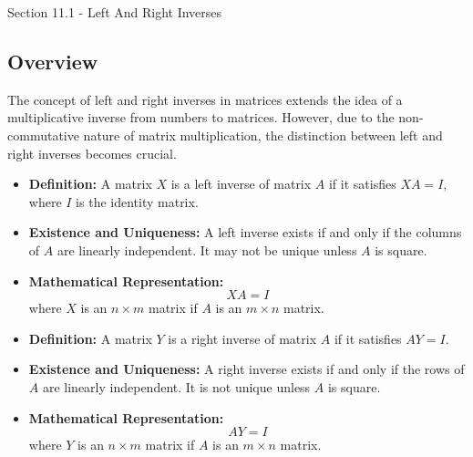 \begin{notes}{Section 11.1 - Left And Right Inverses}
    \subsection*{Overview}

    The concept of left and right inverses in matrices extends the idea of a multiplicative inverse from numbers to matrices. However, due to the non-commutative nature of matrix multiplication, the 
    distinction between left and right inverses becomes crucial. \vspace*{1em}

    \begin{highlight}
        \begin{itemize}
            \item \textbf{Definition:} A matrix $X$ is a left inverse of matrix $A$ if it satisfies $XA = I$, where $I$ is the identity matrix.
            \item \textbf{Existence and Uniqueness:} A left inverse exists if and only if the columns of $A$ are linearly independent. It may not be unique unless $A$ is square.
            \item \textbf{Mathematical Representation:}
            \begin{equation*}
                XA = I
            \end{equation*}
            where $X$ is an $n \times m$ matrix if $A$ is an $m \times n$ matrix.
        \end{itemize}
    \end{highlight}

    \begin{highlight}
        \begin{itemize}
            \item \textbf{Definition:} A matrix $Y$ is a right inverse of matrix $A$ if it satisfies $AY = I$.
            \item \textbf{Existence and Uniqueness:} A right inverse exists if and only if the rows of $A$ are linearly independent. It is not unique unless $A$ is square.
            \item \textbf{Mathematical Representation:} 
            \begin{equation*}
                AY = I
            \end{equation*}
            where $Y$ is an $n \times m$ matrix if $A$ is an $m \times n$ matrix.
        \end{itemize}
    \end{highlight}


\end{notes}
